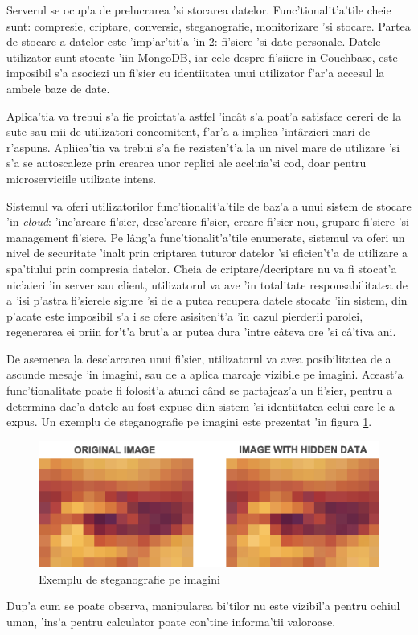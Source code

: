 \documentclass[12pt,a4paper,twoside]{report}
\begin{document}
Serverul se ocup'a de prelucrarea 'si stocarea datelor. Func'tionalit'a'tile cheie sunt: compresie, criptare, conversie, steganografie, monitorizare 'si stocare. Partea de stocare a datelor este 'imp'ar'tit'a 'in 2: fi'siere 'si date personale. Datele utilizator sunt stocate 'iin MongoDB, iar cele despre fi'siiere in Couchbase, este imposibil s'a asociezi un fi'sier cu identiitatea unui utilizator f'ar'a accesul la ambele baze de date.

Aplica'tia  va trebui s'a fie proictat'a  astfel 'incât s'a poat'a satisface cereri de la sute sau mii de utilizatori concomitent, f'ar'a a implica 'intârzieri mari de r'aspuns. Apliica'tia va trebui s'a fie rezisten't'a la un nivel mare de utilizare 'si s'a se autoscaleze prin crearea unor replici ale aceluia'si cod, doar pentru microserviciile utilizate intens.

Sistemul va oferi utilizatorilor func'tionalit'a'tile de baz'a a unui sistem de stocare 'in \textit{cloud}: 'inc'arcare fi'sier, desc'arcare fi'sier, creare fi'sier nou, grupare fi'siere 'si management fi'siere. Pe lâng'a func'tionalit'a'tile enumerate, sistemul va oferi un nivel de securitate 'inalt prin criptarea tuturor datelor 'si eficien't'a de utilizare a spa'tiului prin compresia datelor. Cheia de criptare/decriptare nu va fi stocat'a nic'aieri 'in server sau client, utilizatorul va ave 'in totalitate responsabilitatea de a 'isi p'astra fi'sierele sigure 'si de a putea recupera datele stocate 'iin sistem, din p'acate este imposibil s'a i se ofere asisiten't'a 'in cazul pierderii parolei, regenerarea ei priin for't'a brut'a ar putea dura 'intre câteva ore 'si câ'tiva ani.

De asemenea la desc'arcarea unui fi'sier, utilizatorul va avea posibilitatea de a ascunde mesaje 'in imagini, sau de a aplica marcaje vizibile pe imagini. Aceast'a func'tionalitate poate fi folosit'a atunci când se partajeaz'a un fi'sier, pentru a determina dac'a datele au fost expuse diin sistem 'si identiitatea celui care le-a expus. Un exemplu de steganografie pe imagini este prezentat 'in figura \ref{stegano_example}.
\begin{figure}[H]
\begin{center}
\advance\leftskip-3cm
\advance\rightskip-3cm
\includegraphics[keepaspectratio=true,scale=0.4]{img/stegano_example.png}
\caption{Exemplu de steganografie pe imagini}
\label{stegano_example}
\end{center}
\end{figure}
Dup'a cum se poate observa, manipularea bi'tilor nu este vizibil'a pentru ochiul uman, 'ins'a pentru calculator poate con'tine informa'tii valoroase.
\end{document}
